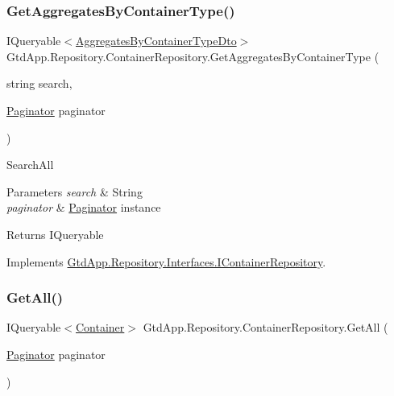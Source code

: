 \subsubsection{\texorpdfstring{Get\+Aggregates\+By\+Container\+Type()}{GetAggregatesByContainerType()}}
{\footnotesize\ttfamily I\+Queryable$<$\mbox{\hyperlink{class_gtd_app_1_1_data_1_1_dto_1_1_aggregates_by_container_type_dto}{Aggregates\+By\+Container\+Type\+Dto}}$>$ Gtd\+App.\+Repository.\+Container\+Repository.\+Get\+Aggregates\+By\+Container\+Type (\begin{DoxyParamCaption}\item[{string}]{search,  }\item[{\mbox{\hyperlink{class_gtd_app_1_1_repository_1_1_paginator}{Paginator}}}]{paginator }\end{DoxyParamCaption})}



Search\+All 


\begin{DoxyParams}{Parameters}
{\em search} & String\\
\hline
{\em paginator} & \mbox{\hyperlink{class_gtd_app_1_1_repository_1_1_paginator}{Paginator}} instance\\
\hline
\end{DoxyParams}
\begin{DoxyReturn}{Returns}
I\+Queryable
\end{DoxyReturn}


Implements \mbox{\hyperlink{interface_gtd_app_1_1_repository_1_1_interfaces_1_1_i_container_repository_a037098c03283c1907e38a7dbcc8a85f4}{Gtd\+App.\+Repository.\+Interfaces.\+I\+Container\+Repository}}.

\mbox{\label{class_gtd_app_1_1_repository_1_1_container_repository_a3ebd6e3082a59533e9053376c8e29f92}} 
\subsubsection{\texorpdfstring{Get\+All()}{GetAll()}}
{\footnotesize\ttfamily I\+Queryable$<$\mbox{\hyperlink{class_gtd_app_1_1_data_1_1_container}{Container}}$>$ Gtd\+App.\+Repository.\+Container\+Repository.\+Get\+All (\begin{DoxyParamCaption}\item[{\mbox{\hyperlink{class_gtd_app_1_1_repository_1_1_paginator}{Paginator}}}]{paginator }\end{DoxyParamCaption})}



